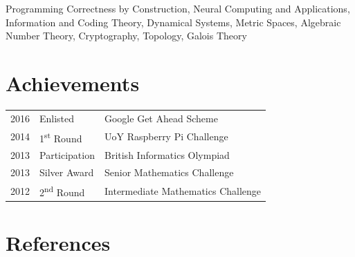 \documentclass[a4paper]{cv}
\begin{document}
\begin{minipage}[t]{0.8\textwidth}
\begin{minipage}[t]{0.55\textwidth}
Programming Correctness by Construction,
Neural Computing and Applications,
Information and Coding Theory,
Dynamical Systems,
Metric Spaces,
Algebraic Number Theory,
Cryptography,
Topology,
Galois Theory

\end{minipage}

\sectionspace %


\section{Achievements}

\begin{tabular}{rll}
2016 & Enlisted & Google Get Ahead Scheme \\
2014 & 1\textsuperscript{st} Round & UoY Raspberry Pi Challenge \\
2013 & Participation & British Informatics Olympiad \\
2013 & Silver Award & Senior Mathematics Challenge \\
2012 & 2\textsuperscript{nd} Round & Intermediate Mathematics Challenge \\
\end{tabular}

\sectionspace %





\section{References}


\end{minipage}
\end{document}

